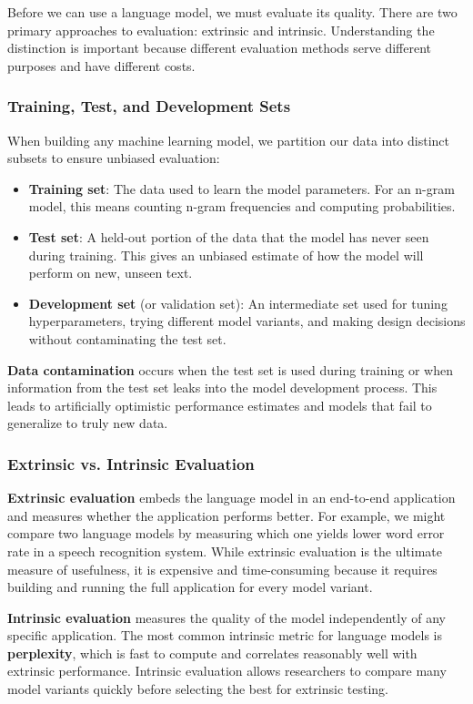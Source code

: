 \documentclass[11pt,a4paper]{article}
\begin{document}
Before we can use a language model, we must evaluate its quality. There are two primary approaches to evaluation: extrinsic and intrinsic. Understanding the distinction is important because different evaluation methods serve different purposes and have different costs.

\subsubsection{Training, Test, and Development Sets}

When building any machine learning model, we partition our data into distinct subsets to ensure unbiased evaluation:
\begin{itemize}
    \item \textbf{Training set}: The data used to learn the model parameters. For an n-gram model, this means counting n-gram frequencies and computing probabilities.
    \item \textbf{Test set}: A held-out portion of the data that the model has never seen during training. This gives an unbiased estimate of how the model will perform on new, unseen text.
    \item \textbf{Development set} (or validation set): An intermediate set used for tuning hyperparameters, trying different model variants, and making design decisions without contaminating the test set.
\end{itemize}

\textbf{Data contamination} occurs when the test set is used during training or when information from the test set leaks into the model development process. This leads to artificially optimistic performance estimates and models that fail to generalize to truly new data.

\subsubsection{Extrinsic vs. Intrinsic Evaluation}

\textbf{Extrinsic evaluation} embeds the language model in an end-to-end application and measures whether the application performs better. For example, we might compare two language models by measuring which one yields lower word error rate in a speech recognition system. While extrinsic evaluation is the ultimate measure of usefulness, it is expensive and time-consuming because it requires building and running the full application for every model variant.

\textbf{Intrinsic evaluation} measures the quality of the model independently of any specific application. The most common intrinsic metric for language models is \textbf{perplexity}, which is fast to compute and correlates reasonably well with extrinsic performance. Intrinsic evaluation allows researchers to compare many model variants quickly before selecting the best for extrinsic testing.
\end{document}
